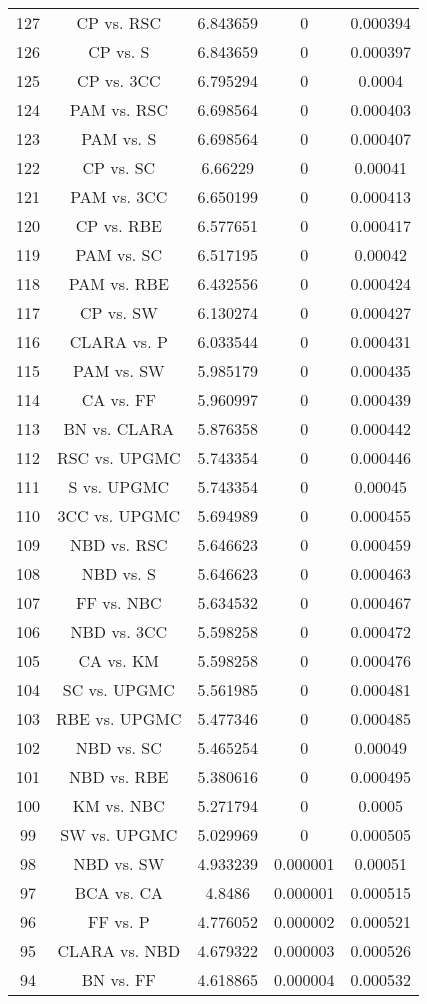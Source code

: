 \documentclass[a4paper,10pt]{article}
\begin{document}
\begin{landscape}
\begin{table}[!htp]
\begin{tabular}{ccccc}
127&CP vs. RSC&6.843659&0&0.000394\\
126&CP vs. S&6.843659&0&0.000397\\
125&CP vs. 3CC&6.795294&0&0.0004\\
124&PAM vs. RSC&6.698564&0&0.000403\\
123&PAM vs. S&6.698564&0&0.000407\\
122&CP vs. SC&6.66229&0&0.00041\\
121&PAM vs. 3CC&6.650199&0&0.000413\\
120&CP vs. RBE&6.577651&0&0.000417\\
119&PAM vs. SC&6.517195&0&0.00042\\
118&PAM vs. RBE&6.432556&0&0.000424\\
117&CP vs. SW&6.130274&0&0.000427\\
116&CLARA vs. P&6.033544&0&0.000431\\
115&PAM vs. SW&5.985179&0&0.000435\\
114&CA vs. FF&5.960997&0&0.000439\\
113&BN vs. CLARA&5.876358&0&0.000442\\
112&RSC vs. UPGMC&5.743354&0&0.000446\\
111&S vs. UPGMC&5.743354&0&0.00045\\
110&3CC vs. UPGMC&5.694989&0&0.000455\\
109&NBD vs. RSC&5.646623&0&0.000459\\
108&NBD vs. S&5.646623&0&0.000463\\
107&FF vs. NBC&5.634532&0&0.000467\\
106&NBD vs. 3CC&5.598258&0&0.000472\\
105&CA vs. KM&5.598258&0&0.000476\\
104&SC vs. UPGMC&5.561985&0&0.000481\\
103&RBE vs. UPGMC&5.477346&0&0.000485\\
102&NBD vs. SC&5.465254&0&0.00049\\
101&NBD vs. RBE&5.380616&0&0.000495\\
100&KM vs. NBC&5.271794&0&0.0005\\
99&SW vs. UPGMC&5.029969&0&0.000505\\
98&NBD vs. SW&4.933239&0.000001&0.00051\\
97&BCA vs. CA&4.8486&0.000001&0.000515\\
96&FF vs. P&4.776052&0.000002&0.000521\\
95&CLARA vs. NBD&4.679322&0.000003&0.000526\\
94&BN vs. FF&4.618865&0.000004&0.000532\\

\end{tabular}
\end{table}
\end{landscape}
\end{document}

